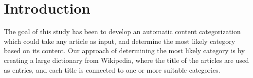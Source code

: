 \chapter{Introduction}
The goal of this study has been to develop an automatic content categorization which could take any article as input, and determine the most likely category based on its content. Our approach of determining the most likely category is by creating a large dictionary from Wikipedia, where the title of the articles are used as entries, and each title is connected to one or more suitable categories.





